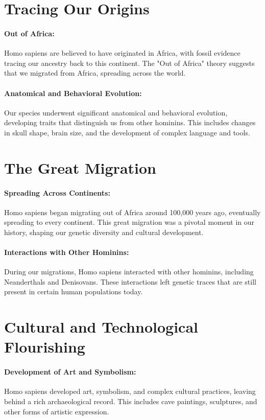 \documentclass{book}
\begin{document}
\section*{Tracing Our Origins}

\paragraph{Out of Africa:}
Homo sapiens are believed to have originated in Africa, with fossil evidence tracing our ancestry back to this continent. The "Out of Africa" theory suggests that we migrated from Africa, spreading across the world.

\paragraph{Anatomical and Behavioral Evolution:}
Our species underwent significant anatomical and behavioral evolution, developing traits that distinguish us from other hominins. This includes changes in skull shape, brain size, and the development of complex language and tools.

\section*{The Great Migration}

\paragraph{Spreading Across Continents:}
Homo sapiens began migrating out of Africa around 100,000 years ago, eventually spreading to every continent. This great migration was a pivotal moment in our history, shaping our genetic diversity and cultural development.

\paragraph{Interactions with Other Hominins:}
During our migrations, Homo sapiens interacted with other hominins, including Neanderthals and Denisovans. These interactions left genetic traces that are still present in certain human populations today.

\section*{Cultural and Technological Flourishing}

\paragraph{Development of Art and Symbolism:}
Homo sapiens developed art, symbolism, and complex cultural practices, leaving behind a rich archaeological record. This includes cave paintings, sculptures, and other forms of artistic expression.
\end{document}
